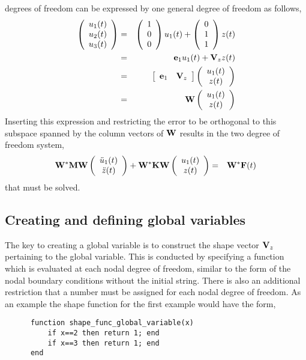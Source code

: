degrees of freedom can be expressed by one 
general degree of freedom as follows,
\begin{eqnarray}
\left(
\begin{array}{c}
{u}_1(t) \\
{u}_2(t) \\
{u}_3(t)
\end{array}
\right)
&=& 
\left(
\begin{array}{c}
1  \\
0  \\
0 
\end{array}
\right)
u_1(t)
+
\left(
\begin{array}{c}
0 \\
1 \\
1
\end{array}
\right)
z(t) \nonumber\\
&=& 
\mathbf{e}_1 u_1(t) + \mathbf{V}_z z(t) \nonumber\\
&=&
\left[
\begin{array}{cc}
\mathbf{e}_1 & \mathbf{V}_z
\end{array}
\right]
\left(
\begin{array}{c}
u_1(t) \\
z(t) 
\end{array}
\right) \nonumber\\
&=& 
\mathbf{W} 
\left(
\begin{array}{c}
u_1(t) \\
z(t) 
\end{array}
\right) 
\end{eqnarray}
Inserting this expression and restricting the error to be 
orthogonal to this subspace spanned by the column vectors of 
$\mathbf{W}$ results in the two degree of freedom system,
\begin{eqnarray}
\mathbf{W}^*\mathbf{M}\mathbf{W}
\left(
\begin{array}{c}
\ddot{u}_1(t) \\
\ddot{z}(t) 
\end{array}
\right) 
+ \mathbf{W}^*\mathbf{K}\mathbf{W} 
\left(
\begin{array}{c}
u_1(t) \\
z(t) 
\end{array}
\right) 
&=& \mathbf{W}^*\mathbf{F}(t)
\end{eqnarray}
that must be solved. 

\subsection{Creating and defining global variables}
The key to creating a global variable is to construct the
shape vector $\mathbf{V}_z$ pertaining to the global variable.
This is conducted by specifying a function which is evaluated at
each nodal degree of freedom, similar to the form of the
nodal boundary conditions without the initial string. There
is also an additional restriction that a number must be assigned
for each nodal degree of freedom. As an example the shape
function for the first example would have the form,
\begin{verbatim}
      function shape_func_global_variable(x)
          if x==2 then return 1; end
          if x==3 then return 1; end
      end
\end{verbatim}

